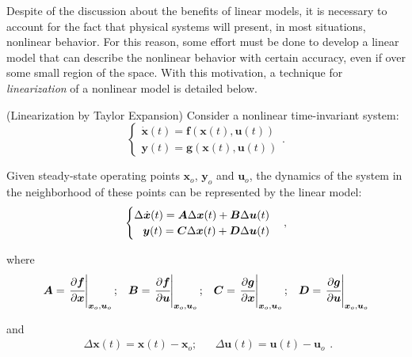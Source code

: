 \documentclass[a4paper,11pt]{book}
\numberwithin{figure}{chapter}
\numberwithin{equation}{chapter}
\numberwithin{table}{chapter}
\newtheorem{theorem}{Theorem}[chapter]
\theoremstyle{definition}
\newcounter{boxed-theorem}
\newenvironment{boxed-theorem}[1]
{\colorlet{shadecolor}{pastelBlue2!5} \begin{shaded} \begin{theorem}{#1}}
{\end{theorem} \end{shaded}}
\newcounter{boxed-lemma}
\newcounter{boxed-definition}
\newcounter{boxed-example}
\begin{document}
Despite of the discussion about the benefits of linear models, it is necessary to account for the fact that physical systems will present, in most situations, nonlinear behavior. For this reason, some effort must be done to develop a linear model that can describe the nonlinear behavior with certain accuracy, even if over some small region of the space. With this motivation, a technique for \textit{linearization} of a nonlinear model is detailed below.

\begin{boxed-theorem}{(Linearization by Taylor Expansion)} \label{th:linearization}
    Consider a nonlinear time-invariant system:
    \begin{equation} \label{eq:SSRepr03}
    \begin{cases}
        \dot{\bm{x}}(t) = \bm{f}(\bm{x}(t), \bm{u}(t)) \\
        \bm{y}(t) = \bm{g}(\bm{x}(t), \bm{u}(t))
    \end{cases}
    .\end{equation}
    
    Given steady-state operating points $\bm{x}_o$, $\bm{y}_o$ and $\bm{u}_o$, the dynamics of the system in the neighborhood of these points can be represented by the linear model: 
    \begin{align}
    \begin{cases}
        \Delta \dot{\bm{x}}(t) = \bm{A}\Delta \bm{x}(t) + \bm{B}\Delta \bm{u}(t) & \\
        \hfill \bm{y}(t) = \bm{C}\Delta \bm{x}(t) + \bm{D}\Delta \bm{u}(t) &
    \end{cases}
    ,\end{align}
    
    \noindent where
    \begin{equation}
    \begin{matrix}
        \bm{A} = \left. \cfrac{\partial \bm{f}}{\partial \bm{x}} \right|_{\bm{x}_o, \bm{u}_o}; & \bm{B} = \left. \cfrac{\partial \bm{f}}{\partial \bm{u}} \right|_{\bm{x}_o, \bm{u}_o}; & \bm{C} = \left. \cfrac{\partial \bm{g}}{\partial \bm{x}} \right|_{\bm{x}_o,  \bm{u}_o}; & \bm{D} = \left. \cfrac{\partial \bm{g}}{\partial \bm{u}} \right|_{\bm{x}_o, \bm{u}_o} 
    \end{matrix}
    \end{equation}
    
    \noindent and
    \begin{equation}
    \begin{matrix}
        \Delta \bm{x}(t) = \bm{x}(t) - \bm{x}_o; & & \Delta \bm{u}(t) = \bm{u}(t) - \bm{u}_o
    \end{matrix}
    .\end{equation}
\end{boxed-theorem}
\end{document}
